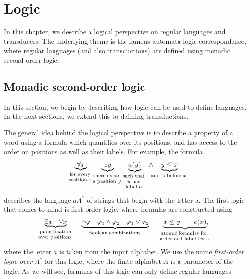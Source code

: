 \section{Logic}
\label{sec:logic}
In this chapter, we describe a logical perspective on regular languages and transducers. The underlying theme is the famous automata-logic correspondence, where regular languages (and also transductions) are defined using monadic second-order logic.

\subsection{Monadic second-order logic}
\label{sec:mso-logic-languages}
In this section, we begin by describing how logic can be used to define languages. In the next sections, we extend this to defining transductions.

The general idea behind the logical perspective is to describe a property of a word using a formula which quantifies over its positions, and has access to the order on positions as well as their labels. For example, the formula 
\begin{align*}
\myunderbrace{\forall x}{for every \\ position $x$} \qquad 
\myunderbrace{\exists y}{there exists \\ a position $y$} \qquad 
\myunderbrace{a(y)}{such that \\ $y$  has \\ label $a$} \quad \land \quad 
\myunderbrace{y \le x}{and is before $x$}
\end{align*}
describes the language $aA^*$ of strings that begin with the letter $a$. The first logic that comes to mind is first-order logic, where formulas are constructed using 
\begin{align*}
\myunderbrace{\exists x \quad \forall x}{quantification \\ over positions}
\qquad 
\myunderbrace{\neg \varphi \quad \varphi_1 \land \varphi_2 \quad \varphi_1 \lor \varphi_2 }{Boolean combinations}
\qquad 
\myunderbrace{x \le y \qquad a(x)}{atomic formulas for \\ order and label tests},
\end{align*}
where the letter $a$ is taken from the input alphabet. We use the name \emph{first-order logic over $A^*$} for this logic, where the finite alphabet $A$ is a parameter of the logic. As we will see, formulas of this logic can only define regular languages. 


